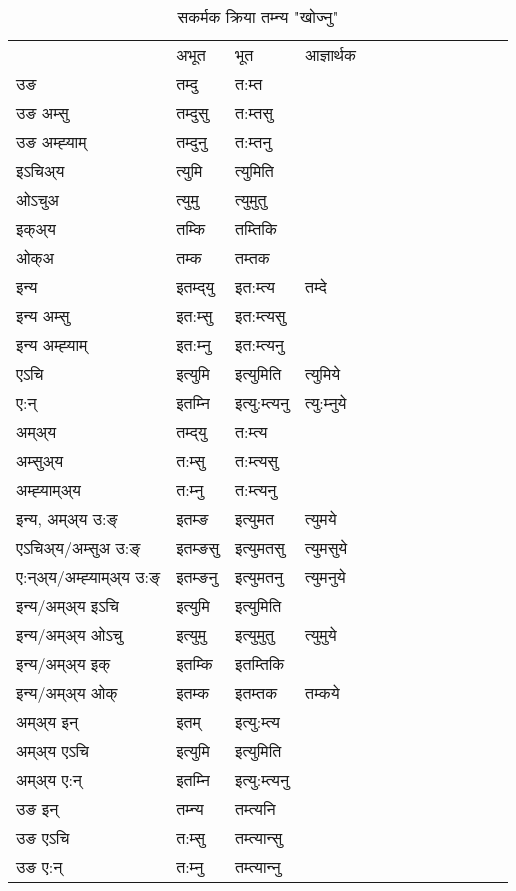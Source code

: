 \begin{table}[H]
\centering
\caption{\label{umt.vt} सकर्मक क्रिया  तम्‍न्य  "खोज्नु"  }
\begin{tabular}{l|l|l|l|l|l|l|l|l|l|l|l|l}  \toprule
&अभूत & भूत & आज्ञार्थक \\ 
उङ &तम्दु &त:म्त \\ 
उङ अम्सु&तम्दुसु &त:म्तसु \\ 
उङ अम्ह्‍याम्&तम्दुनु &त:म्तनु \\ 
इऽचिअ्य &त्युमि &त्युमिति   \\ 
ओऽचुअ        &त्युमु &त्युमुतु   \\ 
इक्अ्य&तम्कि &तम्तिकि   \\ 
ओक्अ &तम्क &तम्तक   \\ 
इन्य & इतम्द्‌यु  & इत:म्त्य &तम्दे  \\ 
इन्य अम्सु& इत:म्सु  & इत:म्त्यसु   \\ 
इन्य अम्ह्‍याम्& इत:म्‍नु  & इत:म्त्यनु   \\ 
एऽचि & इत्युमि & इत्युमिति &त्युमिये    \\ 
ए:न् & इतम्‍नि  & इत्यु:म्त्यनु &त्यु:म्‍नुये  \\ 
अम्अ्य & तम्द्‌यु  & त:म्त्य  \\ 
अम्सुअ्य & त:म्सु & त:म्त्यसु  \\ 
अम्ह्‍याम्अ्य & त:म्‍नु  & त:म्त्यनु \\ 
\midrule
इन्य, अम्अ्य उ:ङ्‌ &इतम्ङ &इत्युमत &त्युमये \\ 
एऽचिअ्य/अम्सुअ उ:ङ्‌ &इतम्ङसु &इत्युमतसु &त्युमसुये \\ 
ए:न्अ्य/अम्ह्‍याम्अ्य उ:ङ्‌ &इतम्ङनु &इत्युमतनु &त्युमनुये \\ 
इन्य/अम्अ्य इऽचि &इत्युमि &इत्युमिति    \\ 
इन्य/अम्अ्य ओऽचु &इत्युमु &इत्युमुतु  &त्युमुये  \\ 
इन्य/अम्अ्य इक् &इतम्कि &इतम्तिकि   \\ 
इन्य/अम्अ्य ओक् &इतम्क &इतम्तक  &तम्कये  \\ 
अम्अ्य इन् & इतम् & इत्यु:म्त्य   \\ 
अम्अ्य एऽचि & इत्युमि & इत्युमिति    \\ 
अम्अ्य ए:न् & इतम्‍नि  & इत्यु:म्त्यनु  \\ 
\midrule
उङ इन् & तम्‍न्य  & तम्त्यनि  \\ 
उङ एऽचि & त:म्सु  & तम्त्यान्सु   \\ 
उङ ए:न्& त:म्‍नु  & तम्त्यान्‍नु   \\ 
\bottomrule
\end{tabular}
\end{table}


